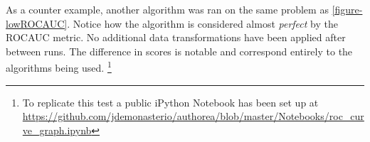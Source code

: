 As a counter example, another algorithm was ran on the same problem as \ref{figure-lowROCAUC}. Notice how the algorithm is considered almost \textit{perfect} by the ROCAUC metric. No additional data transformations have been applied after between runs. The difference in scores is notable and correspond entirely to the algorithms being used. \footnote{To replicate this test a public iPython Notebook has been set up at \url{https://github.com/jdemonasterio/authorea/blob/master/Notebooks/roc_curve_graph.ipynb} }